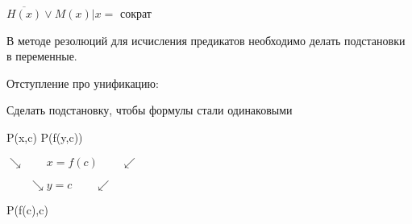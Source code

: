 \documentclass[russian]{lecture-notes}
\begin{document}
    $\overline{H(x)} \lor M(x)| x = $ сократ

    В методе резолюций для исчисления предикатов необходимо делать подстановки в переменные.

    Отступление про унификацию:

    \begin{definition}

        Сделать подстановку, чтобы формулы стали одинаковыми

        \end{definition}

    P(x,c) \qquad \qquad \qquad P(f(y,c))

    $\searrow \qquad  x = f(c) \qquad \swarrow$

    $ \qquad \searrow  y = c \qquad \swarrow$

    \qquad \qquad P(f(c),c)
\end{document}
